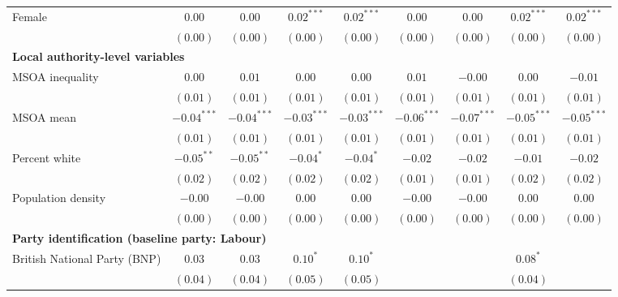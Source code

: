\documentclass[12pt, letter]{scrartcl}
\begin{document}
\begin{tiny}
\begin{longtable}{lcccccccc}
Female                                      & $0.00$        & $0.00$        & $0.02^{***}$  & $0.02^{***}$  & $0.00$        & $0.00$        & $0.02^{***}$  & $0.02^{***}$  \\
                                            & $(0.00)$      & $(0.00)$      & $(0.00)$      & $(0.00)$      & $(0.00)$      & $(0.00)$      & $(0.00)$      & $(0.00)$      \\
\multicolumn{9}{l}{\textbf{Local authority-level variables}} \\[5pt]
MSOA inequality                             & $0.00$        & $0.01$        & $0.00$        & $0.00$        & $0.01$        & $-0.00$       & $0.00$        & $-0.01$       \\
                                            & $(0.01)$      & $(0.01)$      & $(0.01)$      & $(0.01)$      & $(0.01)$      & $(0.01)$      & $(0.01)$      & $(0.01)$      \\
MSOA mean                                   & $-0.04^{***}$ & $-0.04^{***}$ & $-0.03^{***}$ & $-0.03^{***}$ & $-0.06^{***}$ & $-0.07^{***}$ & $-0.05^{***}$ & $-0.05^{***}$ \\
                                            & $(0.01)$      & $(0.01)$      & $(0.01)$      & $(0.01)$      & $(0.01)$      & $(0.01)$      & $(0.01)$      & $(0.01)$      \\
Percent white                               & $-0.05^{**}$  & $-0.05^{**}$  & $-0.04^{*}$   & $-0.04^{*}$   & $-0.02$       & $-0.02$       & $-0.01$       & $-0.02$       \\
                                            & $(0.02)$      & $(0.02)$      & $(0.02)$      & $(0.02)$      & $(0.01)$      & $(0.01)$      & $(0.02)$      & $(0.02)$      \\
Population density                          & $-0.00$       & $-0.00$       & $0.00$        & $0.00$        & $-0.00$       & $-0.00$       & $0.00$        & $0.00$        \\
                                            & $(0.00)$      & $(0.00)$      & $(0.00)$      & $(0.00)$      & $(0.00)$      & $(0.00)$      & $(0.00)$      & $(0.00)$      \\
\multicolumn{5}{l}{\textbf{Party identification (baseline party: Labour)}} \\[5pt]
British National Party (BNP)                & $0.03$        & $0.03$        & $0.10^{*}$    & $0.10^{*}$    &               &               & $0.08^{*}$    &               \\
                                            & $(0.04)$      & $(0.04)$      & $(0.05)$      & $(0.05)$      &               &               & $(0.04)$      &               \\

\end{longtable}
\end{tiny}
\end{document}
